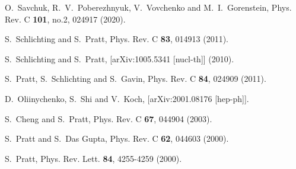 \begin{thebibliography}{99}
O.~Savchuk, R.~V.~Poberezhnyuk, V.~Vovchenko and M.~I.~Gorenstein,
Phys. Rev. C \textbf{101}, no.2, 024917 (2020).

S.~Schlichting and S.~Pratt,
Phys. Rev. C \textbf{83}, 014913 (2011).

S.~Schlichting and S.~Pratt,
[arXiv:1005.5341 [nucl-th]] (2010).

S.~Pratt, S.~Schlichting and S.~Gavin,
Phys. Rev. C \textbf{84}, 024909 (2011).

D.~Oliinychenko, S.~Shi and V.~Koch,
[arXiv:2001.08176 [hep-ph]].

S.~Cheng and S.~Pratt,
Phys. Rev. C \textbf{67}, 044904 (2003).
	
S.~Pratt and S.~Das Gupta,
Phys. Rev. C \textbf{62}, 044603 (2000).

S.~Pratt,
Phys. Rev. Lett. \textbf{84}, 4255-4259 (2000).



\end{thebibliography}
